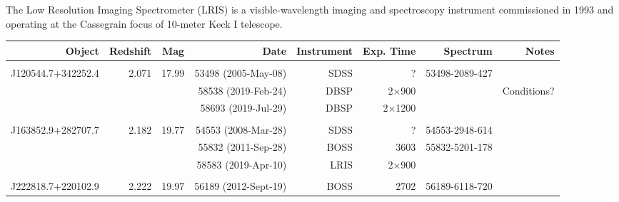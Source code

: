 \documentclass[a4paper,fleqn,usenatbib]{mnras}
\begin{document}
The Low Resolution Imaging Spectrometer (LRIS) is a visible-wavelength
imaging and spectroscopy instrument commissioned in 1993 and operating
at the Cassegrain focus of 10-meter Keck I telescope. 

\begin{table*}
 \centering
 \begin{tabular}{r  r  r r    r r r r}
  \hline \hline 
   Object                          & Redshift  & Mag       & Date                               & Instrument    & Exp. Time            & Spectrum & Notes \\
 \hline 
                                       &                &               &                                         &                   &                             &  & \\
   J120544.7+342252.4   & 2.071     &   17.99   & 53498  (2005-May-08)   & SDSS             & ?                          & 53498-2089-427  & \\
                                       &                &               & 58538 (2019-Feb-24)     & DBSP            &  2$\times$900    &                               &  Conditions? \\
                                       &                &               & 58693 (2019-Jul-29)      & DBSP            &  2$\times$1200   &                                &   \\
                                       &                &               &                                         &                   &                             &  & \\
   J163852.9+282707.7   & 2.182     &   19.77    & 54553 (2008-Mar-28)    & SDSS             & ?                          & 54553-2948-614  & \\
                                        &               &              & 55832  (2011-Sep-28)     & BOSS            &   3603                  & 55832-5201-178  & \\
                                        &               &              & 58583 (2019-Apr-10)        & LRIS              &  2$\times$900    &   & \\
                                       &                &               &                                         &                   &                             &  & \\
    J222818.7+220102.9   & 2.222     & 19.97    & 56189  (2012-Sept-19)     & BOSS             &  2702               & 56189-6118-720   & \\

\end{tabular}
\end{table*}
\end{document}
